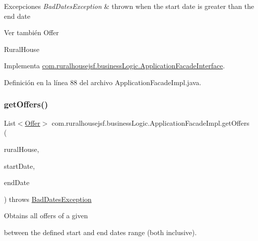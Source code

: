\begin{DoxyExceptions}{Excepciones}
{\em Bad\+Dates\+Exception} & thrown when the start date is greater than the end date\\
\hline
\end{DoxyExceptions}
\begin{DoxySeeAlso}{Ver también}
Offer 

Rural\+House 
\end{DoxySeeAlso}


Implementa \mbox{\hyperlink{interfacecom_1_1ruralhousejsf_1_1business_logic_1_1_application_facade_interface_a31b31b351fd53d7eabe3346b043dc744}{com.\+ruralhousejsf.\+business\+Logic.\+Application\+Facade\+Interface}}.



Definición en la línea 88 del archivo Application\+Facade\+Impl.\+java.

\mbox{\label{classcom_1_1ruralhousejsf_1_1business_logic_1_1_application_facade_impl_a178d3964ff871edce1f5a207331319ed}} 
\subsubsection{\texorpdfstring{getOffers()}{getOffers()}\hspace{0.1cm}{\footnotesize\ttfamily [2/2]}}
{\footnotesize\ttfamily List$<$\mbox{\hyperlink{classcom_1_1ruralhousejsf_1_1domain_1_1_offer}{Offer}}$>$ com.\+ruralhousejsf.\+business\+Logic.\+Application\+Facade\+Impl.\+get\+Offers (\begin{DoxyParamCaption}\item[{\mbox{\hyperlink{classcom_1_1ruralhousejsf_1_1domain_1_1_rural_house}{Rural\+House}}}]{rural\+House,  }\item[{Date}]{start\+Date,  }\item[{Date}]{end\+Date }\end{DoxyParamCaption}) throws \mbox{\hyperlink{classcom_1_1ruralhousejsf_1_1exceptions_1_1_bad_dates_exception}{Bad\+Dates\+Exception}}}

Obtains all offers of a given
\begin{DoxyCode}{0}
\end{DoxyCode}
 between the defined start and end dates range (both inclusive).



